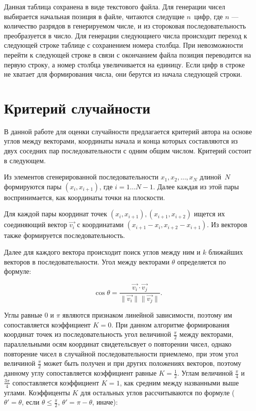 Данная таблица сохранена в виде текстового файла. Для генерации чисел выбирается
начальная позиция в файле, читаются следущие $n$~цифр, где $n$ --- количество
разрядов в генерируемом числе, и из стороковая последовательность преобразуется
в число. Для генерации следующиего числа происходит переход к следующей строке
таблице с сохранением номера столбца. При невозможности перейти к следующей
строке в связи с окончанием файла позиция переводится на первую строку, а номер
столбца увеличивается на единицу. Если цифр в строке не хватает для формирования
числа, они берутся из начала следующей строки.

\section{Критерий случайности}

В данной работе для оценки случайности предлагается критерий автора на основе
углов между векторами, координаты начала и конца которых составляются из двух
соседних пар последовательности с одним общим числом. Критерий состоит в
следующем.

Из элементов сгенерированной последовательности $x_1, x_2, ..., x_N$ длиной~$N$
формируются пары $(x_i, x_{i+1})$, где $i = 1...N-1$. Далее каждая из этой пары
воспринимается, как координаты точки на плоскости.

Для каждой пары координат точек $(x_i, x_{i+1}), (x_{i + 1}, x_{i+2})$ ищется их
соединяющий вектор $\vec{v_i}$ с координатами $(x_{i + 1} - x_i, x_{i + 2} -
x_{i + 1})$. Из векторов также формируется последовательность.

Далее для каждого вектора происходит поиск углов между ним и $k$ ближайших
векторов в последовательности. Угол между векторами $\theta$ определяется по
формуле:

\begin{equation}
    \cos{\theta} = \frac{\vec{v_i} \cdot \vec{v_j}}{\|\vec{v_i}\|\|\vec{v_j}\|}.
\end{equation}

Углы равные $0$ и $\pi$ являются признаком линейной зависимости, поэтому им
сопоставляется коэффициент $K = 0$. При данном алгоритме формирования координат
точек из последовательность угол величиной $\frac{\pi}{2}$ между векторами,
параллельными осям координат свидетельсвует о повторении чисел, однако
повторение чисел в случайной последовательности приемлемо, при этом угол
величиной $\frac{\pi}{2}$ может быть получен и при других положениях векторов,
поэтому данному углу сопоставляется коэффициент равные $K = \frac{1}{2}$. Углам
величиной $\frac{\pi}{4}$ и $\frac{3\pi}{4}$ сопоставляется коэффициент $K = 1$,
как средним между названными выше углами. Коэффиценты $K$ для остальных углов
рассчитываются по формуле ($\theta' = \theta$, если $\theta \leq \frac{\pi}{2}$,
$\theta' = \pi - \theta$, иначе):

